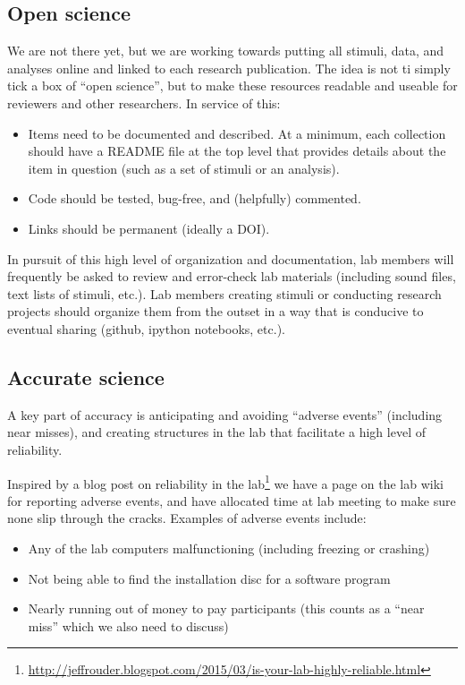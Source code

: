 \documentclass[letterpaper,12pt,oneside]{memoir}
\begin{document}
\subsection{Open science}

We are not there yet, but we are working towards putting all stimuli, data, and analyses online and linked to each research publication. The idea is not ti simply tick a box of ``open science'', but to make these resources readable and useable for reviewers and other researchers. In service of this:

\begin{itemize}
\item Items need to be documented and described. At a minimum, each collection should have a README file at the top level that provides details about the item in question (such as a set of stimuli or an analysis).
\item Code should be tested, bug-free, and (helpfully) commented.
\item Links should be permanent (ideally a DOI).
\end{itemize}

In pursuit of this high level of organization and documentation, lab members will frequently be asked to review and error-check lab materials (including sound files, text lists of stimuli, etc.). Lab members creating stimuli or conducting research projects should organize them from the outset in a way that is conducive to eventual sharing (github, ipython notebooks, etc.).


\subsection{Accurate science}

A key part of accuracy is anticipating and avoiding ``adverse events'' (including near misses), and creating structures in the lab that facilitate a high level of reliability.

Inspired by a blog post on reliability in the lab\footnote{\url{http://jeffrouder.blogspot.com/2015/03/is-your-lab-highly-reliable.html}} we have a page on the lab wiki for reporting adverse events, and have allocated time at lab meeting to make sure none slip through the cracks. Examples of adverse events include:

\begin{itemize}
\item Any of the lab computers malfunctioning (including freezing or crashing)
\item Not being able to find the installation disc for a software program
\item Nearly running out of money to pay participants (this counts as a ``near miss'' which we also need to discuss)
\end{itemize}
\end{document}
